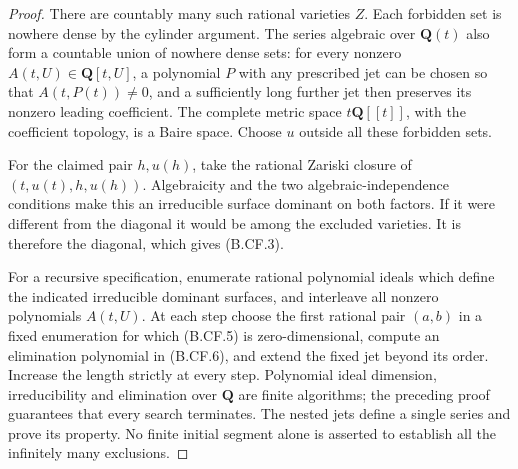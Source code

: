 \documentclass[11pt,a4paper]{article}
\newcommand{\Q}{\mathbf Q}
\begin{document}
\begin{proof}
There are countably many such rational varieties \(Z\). Each
forbidden set is nowhere dense by the cylinder argument. The series
algebraic over \(\Q(t)\) also form a countable union of nowhere dense
sets: for every nonzero \(A(t,U)\in\Q[t,U]\), a polynomial \(P\)
with any prescribed jet can be chosen so that \(A(t,P(t))\ne0\),
and a sufficiently long further jet then preserves its nonzero
leading coefficient. The complete metric space \(t\Q[[t]]\), with
the coefficient topology, is a Baire space. Choose \(u\) outside
all these forbidden sets.

For the claimed pair \(h,u(h)\), take the rational Zariski closure of
\((t,u(t),h,u(h))\). Algebraicity and the two algebraic-independence
conditions make this an irreducible surface dominant on both factors.
If it were different from the diagonal it would be among the excluded
varieties. It is therefore the diagonal, which gives (B.CF.3).

For a recursive specification, enumerate rational polynomial ideals
which define the indicated irreducible dominant surfaces, and
interleave all nonzero polynomials \(A(t,U)\). At each step choose
the first rational pair \((a,b)\) in a fixed enumeration for which
(B.CF.5) is zero-dimensional, compute an elimination polynomial in
(B.CF.6), and extend the fixed jet beyond its order. Increase the
length strictly at every step. Polynomial ideal dimension,
irreducibility and elimination over \(\Q\) are finite algorithms;
the preceding proof guarantees that every search terminates. The
nested jets define a single series and prove its property. No finite
initial segment alone is asserted to establish all the infinitely
many exclusions.
\end{proof}
\end{document}
